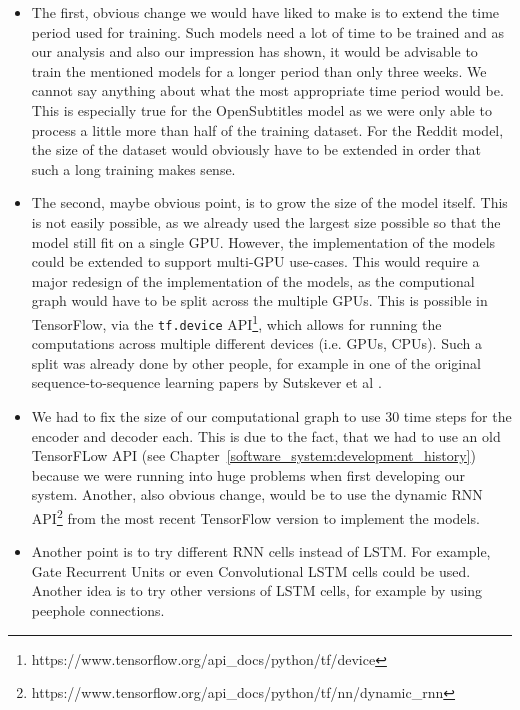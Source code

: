 \begin{itemize}
  \item The first, obvious change we would have liked to make is to extend the time period used for training. Such models need a lot of time to be trained and as our analysis and also our impression has shown, it would be advisable to train the mentioned models for a longer period than only three weeks. We cannot say anything about what the most appropriate time period would be. This is especially true for the OpenSubtitles model as we were only able to process a little more than half of the training dataset. For the Reddit model, the size of the dataset would obviously have to be extended in order that such a long training makes sense.
  
  \item The second, maybe obvious point, is to grow the size of the model itself. This is not easily possible, as we already used the largest size possible so that the model still fit on a single GPU. However, the implementation of the models could be extended to support multi-GPU use-cases. This would require a major redesign of the implementation of the models, as the computional graph would have to be split across the multiple GPUs. This is possible in TensorFlow, via the \texttt{tf.device} API\footnote{https://www.tensorflow.org/api_docs/python/tf/device}, which allows for running the computations across multiple different devices (i.e. GPUs, CPUs). Such a split was already done by other people, for example in one of the original sequence-to-sequence learning papers by Sutskever et al \cite{Sutskever:2014}.

  \item We had to fix the size of our computational graph to use 30 time steps for the encoder and decoder each. This is due to the fact, that we had to use an old TensorFLow API (see Chapter~\ref{software_system:development_history}) because we were running into huge problems when first developing our system. Another, also obvious change, would be to use the dynamic RNN API\footnote{https://www.tensorflow.org/api_docs/python/tf/nn/dynamic_rnn} from the most recent TensorFlow version to implement the models.
  
  \item Another point is to try different RNN cells instead of LSTM. For example, Gate Recurrent Units \cite{Chung:2014} or even Convolutional LSTM \cite{Xingjian:2015} cells could be used. Another idea is to try other versions of LSTM cells, for example by using peephole connections.


\end{itemize}
